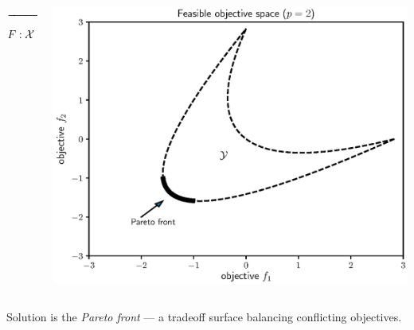 \documentclass[aspectratio=169]{beamer}
\begin{document}
\begin{frame}
\begin{columns}
\begin{column}{.2\textwidth}
\begin{center}
{}
$\xrightarrow{\hspace*{2cm}}$
$$
F : {\cal X} \rightarrow {\cal Y}
$$
\end{center}
\end{column}
\begin{column}{.35\textwidth}
\includegraphics[width=\textwidth]{../img/moo_old/convex_pareto.eps}
\end{column}
\end{columns}
\medskip
Solution is the {\it Pareto front} --- a tradeoff surface balancing
conflicting objectives.
\end{frame}
\end{document}

